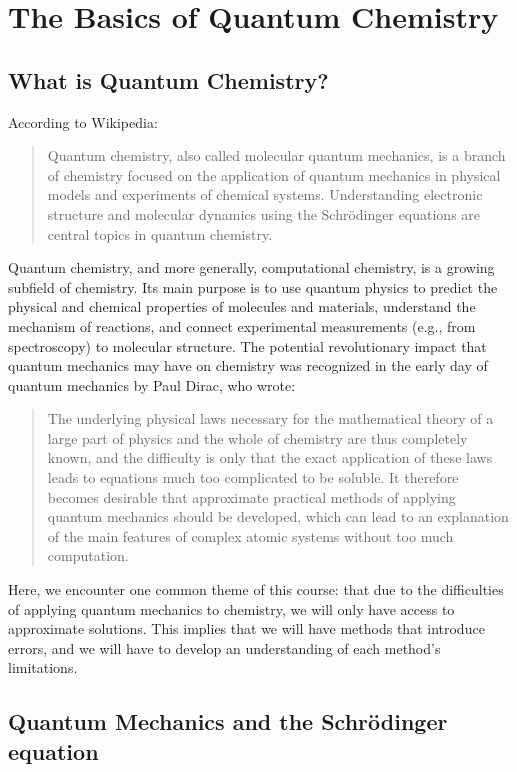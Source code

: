 \documentclass[../Main/notes.tex]{subfiles}
\begin{document}
\chapter{The Basics of Quantum Chemistry}

\section{What is Quantum Chemistry?}
According to Wikipedia:
\begin{quotation}
Quantum chemistry, also called molecular quantum mechanics, is a branch of chemistry focused on the application of quantum mechanics in physical models and experiments of chemical systems.
Understanding electronic structure and molecular dynamics using the Schrödinger equations are central topics in quantum chemistry.
\end{quotation}

Quantum chemistry, and more generally, computational chemistry, is a growing subfield of chemistry.
Its main purpose is to use quantum physics to predict the physical and chemical properties of molecules and materials, understand the mechanism of reactions, and connect experimental measurements (e.g., from spectroscopy) to molecular structure.
The potential revolutionary impact that quantum mechanics may have on chemistry was recognized in the early day of quantum mechanics by Paul Dirac, who wrote:
\begin{quotation}
The underlying physical laws necessary for the mathematical theory of a large part of physics and the whole of chemistry are thus completely known, and the difficulty is only that the exact application of these laws leads to equations much too complicated to be soluble.
It therefore becomes desirable that approximate practical methods of applying quantum mechanics should be developed, which can lead to an explanation of the main features of complex atomic systems without too much computation.
\end{quotation}

Here, we encounter one common theme of this course: that due to the difficulties of applying quantum mechanics to chemistry, we will only have access to approximate solutions.
This implies that we will have methods that introduce errors, and we will have to develop an understanding of each method's limitations.

\section{Quantum Mechanics and the Schr\"{o}dinger equation}
\end{document}
